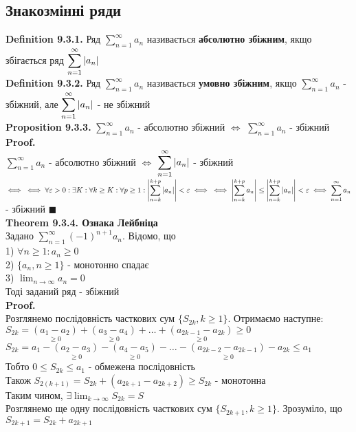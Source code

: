 \documentclass[a4paper, 14pt]{extarticle}
\def\huge{\displaystyle}
\def\bigline{\vspace{5mm}\\}
\def\defin#1{\textbf{Definition {#1}}}
\def\prp#1{\textbf{Proposition {#1}}}
\def\th#1{\textbf{Theorem {#1}}}
\def\proof{\textbf{Proof.}\\}
\def\bigline{\vspace{5mm}\\}
\def\qed{$\blacksquare$}
\begin{document}
\subsection{Знакозмінні ряди}
\defin{9.3.1.} Ряд $\huge \sum_{n=1}^\infty a_n$ називається \textbf{абсолютно збіжним}, якщо збігається ряд $\huge \sum_{n=1}^\infty \abs{a_n}$
\bigline
\defin{9.3.2.} Ряд $\huge \sum_{n=1}^\infty a_n$ називається \textbf{умовно збіжним}, якщо $\huge \sum_{n=1}^\infty a_n$ - збіжний, але $\huge \sum_{n=1}^\infty \abs{a_n}$ - не збіжний
\bigline
\prp{9.3.3.} $\huge \sum_{n=1}^\infty a_n$ - абсолютно збіжний $\iff$ $\huge \sum_{n=1}^\infty a_n$ - збіжний\\
\proof
$\huge \sum_{n=1}^\infty a_n$ - абсолютно збіжний $\iff$ $\huge \sum_{n=1}^\infty \abs{a_n}$ - збіжний $\iff \\ \iff \forall \varepsilon > 0: \exists K: \forall k \geq K: \forall p \geq 1: \huge \abs{\sum_{n=k}^{k+p} \abs{a_n}} < \varepsilon \iff \\
\iff \abs{\sum_{n=k}^{k+p} a_n} \leq \abs{\sum_{n=k}^{k+p} \abs{a_n}} < \varepsilon \iff  \sum_{n=1}^\infty a_n$ - збіжний \qed
\bigline
\th{9.3.4. Ознака Лейбніца}\\
Задано  $\huge \sum_{n=1}^\infty (-1)^{n+1}a_n$. Відомо, що\\
1) $\forall n \geq 1: a_n \geq 0$\\
2) $\{a_n, n \geq 1 \}$ - монотонно спадає\\
3) $\huge \lim_{n \to \infty} a_n = 0$\\
Тоді заданий ряд - збіжний\\
\proof
Розглянемо послідовність часткових сум $\{S_{2k}, k \geq 1 \}$. Отримаємо наступне:\\
$S_{2k} = \underset{\geq 0}{(a_1 - a_2)} + \underset{\geq 0}{(a_3 - a_4)} + \dots + \underset{\geq 0}{(a_{2k-1} - a_{2k})} \geq 0$\\
$S_{2k} = a_1 - \underset{\geq 0}{(a_2 - a_3)} - \underset{\geq 0}{(a_4 - a_5)} - \dots - \underset{\geq 0}{(a_{2k-2} - a_{2k-1})} - a_{2k} \leq a_1$\\
Тобто $0 \leq S_{2k} \leq a_1$ - обмежена послідовність\\
Також $S_{2(k+1)} = S_{2k} + (a_{2k+1}-a_{2k+2}) \geq S_{2k}$ - монотонна\\
Таким чином, $\exists \huge \lim_{k \to \infty} S_{2k} = S$\\
Розглянемо ще одну послідовність часткових сум $\{S_{2k+1}, k \geq 1\}$. Зрозуміло, що\\
$S_{2k+1} = S_{2k} + a_{2k+1}$\\
\end{document}
